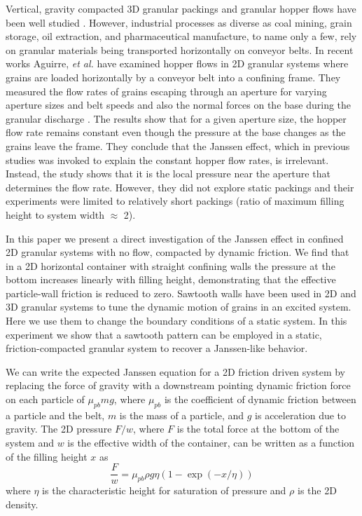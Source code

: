 Vertical, gravity compacted 3D granular packings and granular hopper flows have been well studied \cite{nedderman_flow_1982, kadanoff_built_1999, de_gennes_granular_1999,  bertho_dynamical_2003, landry_confined_2003, mankoc_flow_2007, hilton_granular_2011}. However, industrial processes as diverse as coal mining, grain storage, oil extraction, and pharmaceutical manufacture, to name only a few, rely on granular materials being transported horizontally on conveyor belts. In recent works Aguirre, \textit{et al.} have examined hopper flows in 2D granular systems where grains are loaded horizontally by a conveyor belt into a confining frame. They measured the flow rates of grains escaping through an aperture for varying aperture sizes and belt speeds \cite{aguirre_pressure_2010} and also the normal forces on the base during the granular discharge \cite{aguirre_granular_2011}. The results show that for a given aperture size, the hopper flow rate remains constant even though the pressure at the base changes as the grains leave the frame. They conclude that the Janssen effect, which in previous studies was invoked to explain the constant hopper flow rates, is irrelevant.  Instead, the study shows that it is the local pressure near the aperture that determines the flow rate. However, they did not explore static packings and their experiments were limited to relatively short packings (ratio of maximum filling height to system width $\approx$ 2).

In this paper we present a direct investigation of the Janssen effect in confined 2D granular systems with no flow, compacted by dynamic friction.  We find that in a 2D horizontal container with straight confining walls the pressure at the bottom increases linearly with filling height, demonstrating that the effective particle-wall friction is reduced to zero. Sawtooth walls have been used in 2D \cite{farkas_segregation_2002, mobarakabadi_granular_2013} and 3D \cite{derenyi_collective_1998, farkas_transitions_1999} granular systems to tune the dynamic motion of grains in an excited system.  Here we use them to change the boundary conditions of a static system. In this experiment we show that a sawtooth pattern can be employed in a static, friction-compacted granular system to recover a Janssen-like behavior. 

We can write the expected Janssen equation for a 2D friction driven system by replacing the force of gravity with a downstream pointing dynamic friction force on each particle of $\mu_{pb} m g$, where $\mu_{pb}$ is the coefficient of dynamic friction between a particle and the belt, $m$ is the mass of a particle, and $g$ is acceleration due to gravity. The 2D pressure $F/w$, where $F$ is the total force at the bottom of the system and $w$ is the effective width of the container, can be written as a function of the filling height $x$ as
%
\begin{equation} 
\frac{F}{w}=\mu_{pb} \rho g \eta (1 - \exp(-x/\eta))
\label{eq:janssen}
\end{equation}
%
where $\eta$ is the characteristic height for saturation of pressure and $\rho$ is the 2D density.

